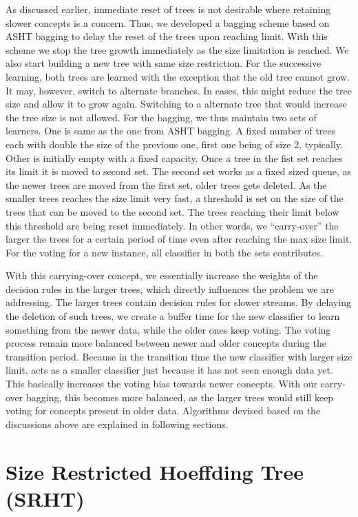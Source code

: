 As discussed earlier,  immediate reset of trees is not desirable where retaining  slower concepts is a concern. Thus, we developed a bagging scheme based on ASHT bagging to delay the reset of the trees upon reaching limit. With this scheme we stop the tree growth immediately as the size limitation is reached. We also start building a new tree with same size restriction. For the successive learning, both trees are learned with the exception that the old tree cannot grow. It may, however, switch to alternate branches. In cases, this might reduce the tree size and allow it to grow again. Switching to a alternate tree that would increase the tree size is not allowed. For the bagging, we thus maintain two sets of learners. One is same as the one from ASHT bagging. A fixed number of trees each with double the size of the previous one, first one being of size 2, typically. Other is initially empty with a fixed capacity. Once a tree in the fist set reaches its limit it is moved to second set. The second set works as a fixed sized queue, as the newer trees are moved from the first set, older trees gets deleted. As the smaller trees reaches the size limit very fast, a threshold is set on the size of the trees that can be moved to the second set. The trees reaching their limit below this threshold are being reset immediately. In other words, we ``carry-over'' the larger the trees for a certain period of time even after reaching the max size limit. For the voting for a new instance, all classifier in both the sets contributes.

With this carrying-over concept, we essentially increase the weights of the decision rules in the larger trees, which directly influences the problem we are addressing. The larger trees contain decision rules for slower streams. By delaying the deletion of such trees, we create a buffer time for the new classifier to learn something from the newer data, while the older ones keep voting. The voting process remain more balanced between newer and older concepts during the transition period. Because in the transition time the new classifier with larger size limit, acts as a smaller classifier just because it has not seen enough data yet. This basically increases the voting bias towards newer concepts. With our  carry-over bagging, this becomes more balanced, as the larger trees would still keep voting for concepts present in older data. Algorithms devised based on the discussions above are explained in following sections.

\section{Size Restricted Hoeffding Tree (SRHT)}

